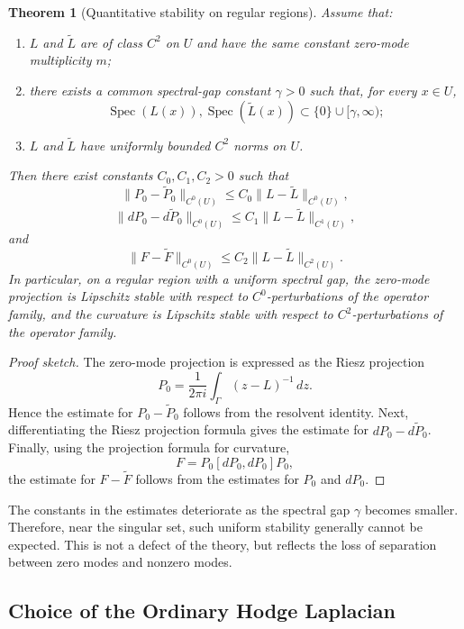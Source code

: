 \documentclass[pdflatex,sn-mathphys-num]{sn-jnl}%
\theoremstyle{thmstyleone}%
\newtheorem{theorem}{Theorem}%
\theoremstyle{thmstyletwo}%
\theoremstyle{thmstylethree}%
\begin{document}
\begin{theorem}[Quantitative stability on regular regions]
Assume that:
\begin{enumerate}
\item \(L\) and \(\widetilde L\) are of class \(C^2\) on \(U\) and have the same constant zero-mode multiplicity \(m\);
\item there exists a common spectral-gap constant \(\gamma>0\) such that, for every \(x\in U\),
\[
\operatorname{Spec}(L(x)),
\operatorname{Spec}(\widetilde L(x))
\subset
\{0\}\cup[\gamma,\infty);
\]
\item \(L\) and \(\widetilde L\) have uniformly bounded \(C^2\) norms on \(U\).
\end{enumerate}
Then there exist constants \(C_0,C_1,C_2>0\) such that
\[
\|P_0-\widetilde P_0\|_{C^0(U)}
\le
C_0\|L-\widetilde L\|_{C^0(U)},
\]
\[
\|dP_0-d\widetilde P_0\|_{C^0(U)}
\le
C_1\|L-\widetilde L\|_{C^1(U)},
\]
and
\[
\|F-\widetilde F\|_{C^0(U)}
\le
C_2\|L-\widetilde L\|_{C^2(U)}.
\]
In particular, on a regular region with a uniform spectral gap, the zero-mode projection is Lipschitz stable with respect to \(C^0\)-perturbations of the operator family, and the curvature is Lipschitz stable with respect to \(C^2\)-perturbations of the operator family.
\end{theorem}

\begin{proof}[Proof sketch]
The zero-mode projection is expressed as the Riesz projection
\[
P_0
=
\frac{1}{2\pi i}
\int_\Gamma
(z-L)^{-1}\,dz.
\]
Hence the estimate for \(P_0-\widetilde P_0\) follows from the resolvent identity. Next, differentiating the Riesz projection formula gives the estimate for \(dP_0-d\widetilde P_0\). Finally, using the projection formula for curvature,
\[
F=P_0[dP_0,dP_0]P_0,
\]
the estimate for \(F-\widetilde F\) follows from the estimates for \(P_0\) and \(dP_0\).
\end{proof}


The constants in the estimates deteriorate as the spectral gap \(\gamma\) becomes smaller. Therefore, near the singular set, such uniform stability generally cannot be expected. This is not a defect of the theory, but reflects the loss of separation between zero modes and nonzero modes.

\subsection{Choice of the Ordinary Hodge Laplacian}
\end{document}
